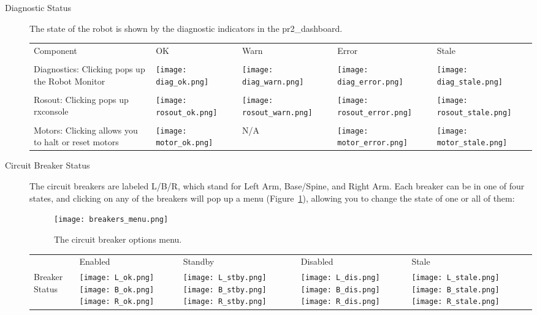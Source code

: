 \begin{description}
\item[Diagnostic Status] The state of the robot is shown by the diagnostic indicators in the pr2\_dashboard. \\

    \begin{tabular}{m{6cm}SSSS}
    Component & OK & Warn & Error & Stale\\
    &&&&\\
    Diagnostics: Clicking pops up the Robot Monitor & \texttt{[image: diag\_ok.png]}&\texttt{[image: diag\_warn.png]}&
                                                      \texttt{[image: diag\_error.png]}&\texttt{[image: diag\_stale.png]}\\
    &&&&\\
    Rosout: Clicking pops up rxconsole & \texttt{[image: rosout\_ok.png]}&\texttt{[image: rosout\_warn.png]}&
                                        \texttt{[image: rosout\_error.png]}&\texttt{[image: rosout\_stale.png]}\\
    &&&&\\
    Motors: Clicking allows you to halt or reset motors & \texttt{[image: motor\_ok.png]}& N/A &
                                                          \texttt{[image: motor\_error.png]}&\texttt{[image: motor\_stale.png]}\\
   \end{tabular}

\item[Circuit Breaker Status] The circuit breakers are labeled L/B/R, which stand for Left Arm, Base/Spine, and Right Arm. 
Each breaker can be in one of four states, and clicking on any of the breakers will pop up a menu (Figure~\ref{fig:breaker_menu}), allowing you to change the state of one or all of them:
\begin{figure}[h]
\centering
\texttt{[image: breakers\_menu.png]}
\caption{The circuit breaker options menu.}
\label{fig:breaker_menu}
\end{figure}

    \begin{tabular}{m{2.6cm}SSSS}
     & Enabled & Standby & Disabled & Stale\\
    Breaker Status & \texttt{[image: L\_ok.png]}\texttt{[image: B\_ok.png]}\texttt{[image: R\_ok.png]}&
                     \texttt{[image: L\_stby.png]}\texttt{[image: B\_stby.png]}\texttt{[image: R\_stby.png]}&
                     \texttt{[image: L\_dis.png]}\texttt{[image: B\_dis.png]}\texttt{[image: R\_dis.png]}&
                     \texttt{[image: L\_stale.png]}\texttt{[image: B\_stale.png]}\texttt{[image: R\_stale.png]}\\
   \end{tabular}




\end{description}
